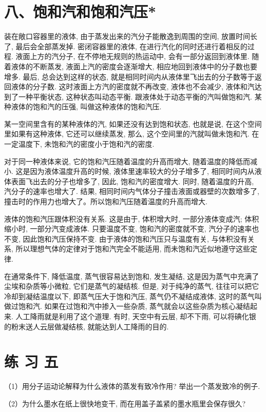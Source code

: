 \documentclass[10pt]{article}
\begin{document}
\section*{八、饱和汽和饱和汽压*}

装在敞口容器里的液体, 由于蒸发出来的汽分子能散逸到周围的空间, 放置时间长了, 最后会全部蒸发掉. 密闭容器里的液体, 在进行汽化的同时还进行着相反的过程. 液面上方的汽分子, 在不停地无规则的热运动中, 会有一部分返回到液体里. 随着液体的不断蒸发, 液面上汽的密度会逐渐增大, 相应地回到液体中的分子数也要增多. 最后, 总会达到这样的状态, 就是相同时间内从液体里飞出去的分子数等于返回液体的分子数. 这时液面上方汽的密度就不再改变, 液体也不会减少, 液体和汽达到了一种平衡状态, 这种状态叫动态平衡. 跟液体处于动态平衡的汽叫做饱和汽. 某种液体的饱和汽的压强, 叫做这种液体的饱和汽压.

某一空间里含有的某种液体的汽, 如果还没有达到饱和状态, 也就是说, 在这个空间里如果有这种液体, 它还可以继续蒸发, 那么, 这个空间里的汽就叫做未饱和汽. 在一定温度下, 未饱和汽的密度小于饱和汽的密度.

对于同一种液体来说, 它的饱和汽压随着温度的升高而增大, 随着温度的降低而减小. 这是因为液体温度升高的时候, 液体里速率较大的分子增多了, 相同时间内从液体表面飞出去的分子也增多了, 因此, 饱和汽的密度增大. 同时, 随着温度的升高, 汽分子的速率也增大了. 结果, 相同时间内气体分子撞击液面或器壁的次数增多了, 撞击时的作用力也增大了。所以饱和汽压随着温度的升高而增大.

液体的饱和汽压跟体积没有关系. 这是由于, 体积增大时, 一部分液体变成汽; 体积缩小时, 一部分汽变成液体. 只要温度不变, 饱和汽的密度就不变, 汽分子的速率也不变, 因此饱和汽压保持不变. 由于液体的饱和汽压只与温度有关, 与体积没有关系, 所以理想气体的定律对于饱和汽完全不能适用, 而未饱和汽近似地遵守这些定律.

在通常条件下, 降低温度, 蒸气很容易达到饱和, 发生凝结, 这是因为蒸气中充满了尘埃和杂质等小微粒, 它们是蒸气的凝结核. 但是, 对于纯净的蒸气, 往往可以把它冷却到凝结温度以下, 即蒸气压大于饱和汽压, 蒸气仍不凝结成液体, 这时的蒸气叫做过饱和汽. 如果在过饱和汽中掺入一些杂质, 蒸气就会以这些杂质为核心凝结起来. 人工降雨就是利用了这个道理. 有时, 天空中有云层, 却不下雨, 可以将碘化银的粉末送人云层做凝结核, 就能达到人工降雨的目的.

\section*{练 习 五}

（1）用分子运动论解释为什么液体的蒸发有致冷作用? 举出一个蒸发致冷的例子.

（2）为什么墨水在纸上很快地变干, 而在用盖子盖紧的墨水瓶里会保存很久?
\end{document}
